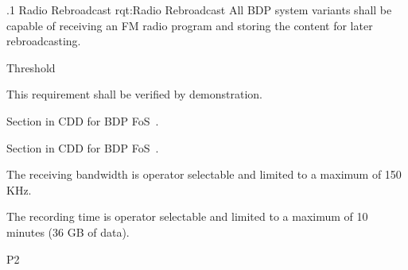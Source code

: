\ONERQMTVKSA
{\RqtNumberBase.1}
{Radio Rebroadcast}
{rqt:Radio Rebroadcast}
{All BDP system variants shall be capable of receiving an FM radio program and storing the content for later rebroadcasting.}%
{
	\item [Phase 1] Threshold
}
{This requirement shall be verified by demonstration.}
{
\item [5.5.5] Section in CDD for BDP FoS~\cite{ref__BDP_FOS_CDD}.
\item [5.5.12] Section in CDD for BDP FoS~\cite{ref__BDP_FOS_CDD}.
}
{
	\item The receiving bandwidth is operator selectable and limited to a maximum of 150 KHz.
	\item The recording time is operator selectable and limited to a maximum of 10 minutes (36 GB of data).
}
{P2}

